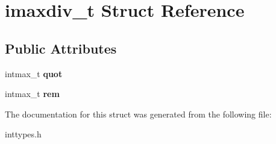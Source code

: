 \hypertarget{a02300}{}\section{imaxdiv\+\_\+t Struct Reference}
\label{a02300}
\subsection*{Public Attributes}
\begin{DoxyCompactItemize}
\item 
\mbox{\label{a02300_a9339814cbb7610c72fb7d30c6573b393}} 
intmax\+\_\+t {\bfseries quot}
\item 
\mbox{\label{a02300_a6c9701ad10bff81edae7ff679cae7850}} 
intmax\+\_\+t {\bfseries rem}
\end{DoxyCompactItemize}


The documentation for this struct was generated from the following file\+:\begin{DoxyCompactItemize}
\item 
inttypes.\+h\end{DoxyCompactItemize}
